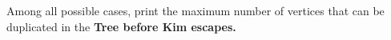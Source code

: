 Among all possible cases, print the maximum number of vertices that can be duplicated in the \bf{Tree} before Kim escapes.
